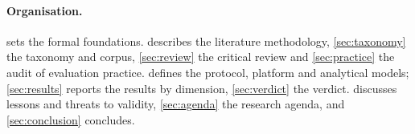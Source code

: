 \paragraph{Organisation.}  sets the formal foundations.  describes the literature methodology, \cref{sec:taxonomy} the taxonomy and corpus, \cref{sec:review} the critical review and \cref{sec:practice} the audit of evaluation practice.  defines the protocol, platform and analytical models; \cref{sec:results} reports the results by dimension, \cref{sec:verdict} the verdict.  discusses lessons and threats to validity, \cref{sec:agenda} the research agenda, and \cref{sec:conclusion} concludes.
